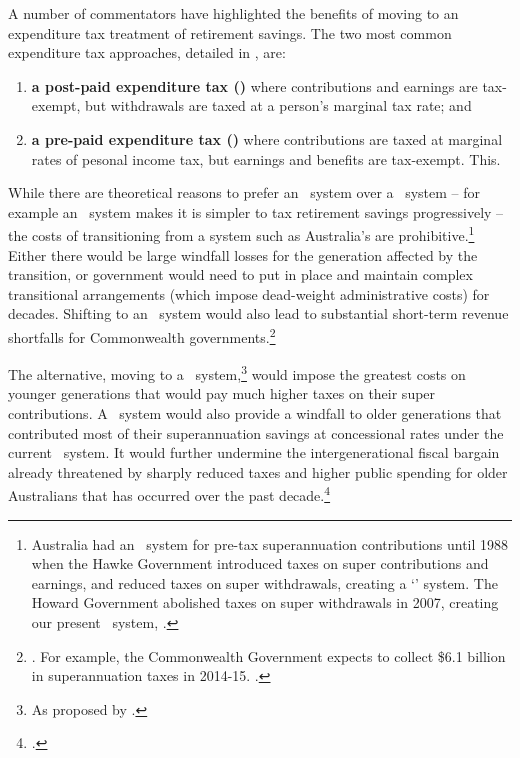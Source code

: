 \documentclass{grattanAlpha}
\begin{document}
A number of commentators have highlighted the benefits of moving to an expenditure tax treatment of retirement savings.  The two most common expenditure tax approaches, detailed in , are: 
\begin{enumerate}
\item \textbf{a post-paid expenditure tax (\EET)} where contributions and earnings are tax-exempt, but withdrawals are taxed at a person's marginal tax rate; and
\item \textbf{a pre-paid expenditure tax (\TEE)} where contributions are taxed at marginal rates of pesonal income tax, but earnings and benefits are tax-exempt. This.
\end{enumerate}
While there are theoretical reasons to prefer an \EET\ system over a \TEE\ system – for example an \EET\ system makes it is simpler to tax retirement savings progressively – the costs of transitioning from a system such as Australia’s are prohibitive.\footnote{Australia had an \EET\ system for pre-tax superannuation contributions until 1988 when the Hawke Government introduced taxes on super contributions and earnings, and reduced taxes on super withdrawals, creating a `\ttt' system. The Howard Government abolished taxes on super withdrawals in 2007, creating our present \ttE\ system, \textcite[][44]{Treasury2008RetirementIncomeConsultPaper}.} Either there would be large windfall losses for the generation affected by the transition, or government would need to put in place and maintain complex transitional arrangements (which impose dead-weight administrative costs) for decades. Shifting to an \EET\ system would also lead to substantial short-term revenue shortfalls for Commonwealth governments.\footnote{\textcite{Mercer2015SubmissionToReThink}. For example, the Commonwealth Government expects to collect \$6.1 billion in superannuation taxes in 2014-15. \textcite[][5]{Treasury2015FinalBudgetOutcome1415}.}

The alternative, moving to a \TEE\ system,\footnote{As proposed by \textcites{MaddockKing2015}{Freebairn2015a}.} would impose the greatest costs on younger generations that would pay much higher taxes on their super contributions. A \TEE\ system would also provide a windfall to older generations that contributed most of their superannuation savings at concessional rates under the current \ttE\ system. It would further undermine the intergenerational fiscal bargain already threatened by sharply reduced taxes and higher public spending for older Australians that has occurred over the past decade.\footcite[][2]{DaleyWoodWeidmannEtAl2014} 
\end{document}
